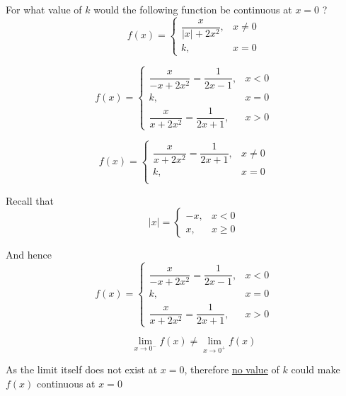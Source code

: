 \documentclass[14pt,fleqn]{extarticle}
\begin{document}
 
\begin{problem}
	\statement 
    
    For what value of $k$ would the following function be continuous at $x=0$ ?
    \[ \qquad f(x) = \begin{cases}
    \dfrac{x}{\vert x\vert + 2x^2}, &x\neq 0 \\
    k,& x = 0
    \end{cases} \] 
    
    \begin{step}
  \begin{options} 
     \correct 
     \[f(x) = \begin{cases}
	\dfrac{x}{-x+2x^2} = \dfrac{1}{2x-1} , & x < 0\\
	k, & x = 0 \\
	\dfrac{x}{x+2x^2} = \dfrac{1}{2x+1}, & x > 0 
	
\end{cases}\]
     \incorrect
        
           \[f(x) = \begin{cases}
           \dfrac{x}{x+2x^2} = \dfrac{1}{2x+1}, & x \neq 0 \\
	k, & x = 0 \\
	
	
\end{cases}\]
    \end{options} 
     \reason 
     
     Recall that 
     \[ \qquad \vert x \vert = \begin{cases}
	-x, & x < 0\\
	x, & x\geq 0
\end{cases} \]

And hence 
     \[f(x) = \begin{cases}
	\dfrac{x}{-x+2x^2} = \dfrac{1}{2x-1} , & x < 0\\
	k, & x = 0 \\
	\dfrac{x}{x+2x^2} = \dfrac{1}{2x+1}, & x > 0 
	
\end{cases}\]
       
\end{step}

\begin{step}
  \begin{options} 
     \correct 
       
       \[ \qquad \lim_{x\to 0^-} f(x) \neq \lim_{x\to 0^+} f(x) \]
       
       As the limit itself does not exist at $x = 0$, therefore \underline{no value} of $k$ could make $f(x)$ continuous at $x = 0$
     \incorrect
     

\end{options}
\end{step}
\end{problem}
\end{document}
